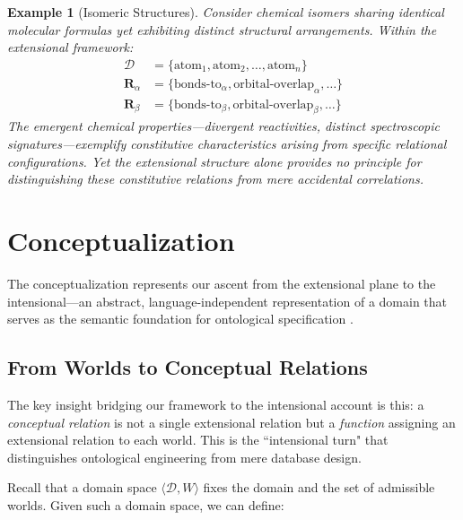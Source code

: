 \documentclass[12pt,a4paper]{article}
\newtheorem{example}[definition]{Example}
\newcommand{\domain}{\mathcal{D}}
\begin{document}
\begin{example}[Isomeric Structures]
Consider chemical isomers sharing identical molecular formulas yet exhibiting distinct structural arrangements. Within the extensional framework:
\begin{align*}
    \domain &= \{\text{atom}_1, \text{atom}_2, \ldots, \text{atom}_n\}\\
    \mathbf{R}_{\alpha} &= \{\text{bonds-to}_\alpha, \text{orbital-overlap}_\alpha, \ldots\}\\
    \mathbf{R}_{\beta} &= \{\text{bonds-to}_\beta, \text{orbital-overlap}_\beta, \ldots\}
\end{align*}
The emergent chemical properties---divergent reactivities, distinct spectroscopic signatures---exemplify constitutive characteristics arising from specific relational configurations. Yet the extensional structure alone provides no principle for distinguishing these constitutive relations from mere accidental correlations.
\end{example}

\section{Conceptualization}

The conceptualization represents our ascent from the extensional plane to the intensional---an abstract, language-independent representation of a domain that serves as the semantic foundation for ontological specification \citep{gruber1995, guarino1998}.

\subsection{From Worlds to Conceptual Relations}

The key insight bridging our framework to the intensional account is this: a \emph{conceptual relation} is not a single extensional relation but a \emph{function} assigning an extensional relation to each world. This is the ``intensional turn" that distinguishes ontological engineering from mere database design.

Recall that a domain space $\langle \domain, W \rangle$ fixes the domain and the set of admissible worlds. Given such a domain space, we can define:
\end{document}
